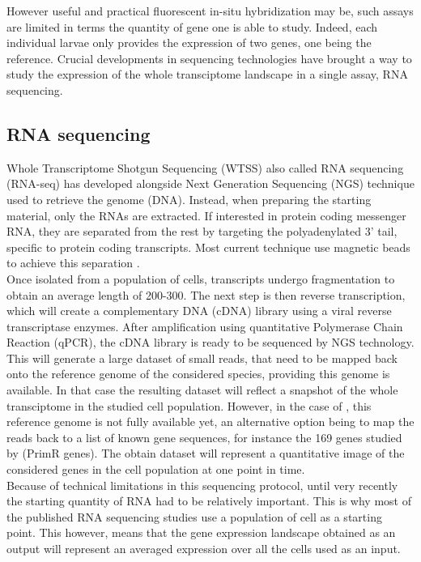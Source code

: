 	However useful and practical fluorescent in-situ hybridization may be, such assays are limited in terms the quantity of gene one is able to study. Indeed, each individual larvae only provides the expression of two genes, one being the reference. Crucial developments in sequencing technologies have brought a way to study the expression of the whole transciptome landscape in a single assay, RNA sequencing.

     \subsection{RNA sequencing}
     Whole Transcriptome Shotgun Sequencing (WTSS) also called RNA sequencing (RNA-seq) \cite{morin08,wang09} has developed alongside Next Generation Sequencing (NGS) technique used to retrieve the genome (DNA). Instead, when preparing the starting material, only the RNAs are extracted. If interested in protein coding messenger RNA, they are separated from the rest by targeting the polyadenylated 3' tail, specific to protein coding transcripts. Most current technique use magnetic beads to achieve this separation \cite{mortazavi08,morin08}.\\
     
    Once isolated from a population of cells, transcripts undergo fragmentation to obtain an average length of 200-300. The next step is then reverse transcription, which will create a complementary DNA (cDNA) library using a viral reverse transcriptase enzymes. After amplification using quantitative Polymerase Chain Reaction (qPCR), the cDNA library is ready to be sequenced by NGS technology.\\
    
    This will generate a large dataset of small reads, that need to be mapped back onto the reference genome of the considered species, providing this genome is available. In that case the resulting dataset will reflect a snapshot of the whole transciptome in the studied cell population. However, in the case of \platy{}, this reference genome is not fully available yet, an alternative option being to map the reads back to a list of known gene sequences, for instance the 169 genes studied by \cite{Tomer10} (PrimR genes). The obtain dataset will represent a quantitative image of the considered genes in the cell population at one point in time.\\
    
    Because of technical limitations in this sequencing protocol, until very recently the starting quantity of RNA had to be relatively important. This is why most of the published RNA sequencing studies use a population of cell as a starting point. This however, means that the gene expression landscape obtained as an output will represent an averaged expression over all the cells used as an input.\\
    
